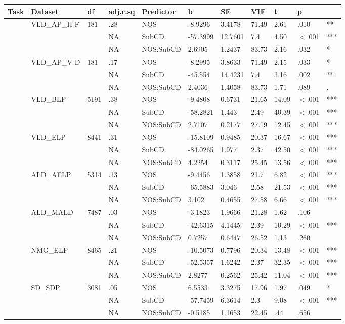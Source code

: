 \begin{table}[ht]
\centering
\begingroup\normalsize
\begin{tabular}{lllllllllll}
  \hline
Task & Dataset & df & adj.r.sq & Predictor & b & SE & VIF & t & p &  \\ 
  \hline
 & VLD\_AP\_H-F & 181 & .28 & NOS & -8.9296 & 3.4178 & 71.49 & 2.61 & .010 & ** \\ 
   &  &  & NA & SubCD & -57.3999 & 12.7601 & 7.4 & 4.50 & $<$.001 & *** \\ 
   &  &  & NA & NOS:SubCD & 2.6905 & 1.2437 & 83.73 & 2.16 & .032 & * \\ 
   & VLD\_AP\_V-D & 181 & .17 & NOS & -8.2995 & 3.8633 & 71.49 & 2.15 & .033 & * \\ 
   &  &  & NA & SubCD & -45.554 & 14.4231 & 7.4 & 3.16 & .002 & ** \\ 
   &  &  & NA & NOS:SubCD & 2.4036 & 1.4058 & 83.73 & 1.71 & .089 & . \\ 
   & VLD\_BLP & 5191 & .38 & NOS & -9.4808 & 0.6731 & 21.65 & 14.09 & $<$.001 & *** \\ 
   &  &  & NA & SubCD & -58.2821 & 1.443 & 2.49 & 40.39 & $<$.001 & *** \\ 
   &  &  & NA & NOS:SubCD & 2.7107 & 0.2177 & 27.19 & 12.45 & $<$.001 & *** \\ 
   & VLD\_ELP & 8441 & .31 & NOS & -15.8109 & 0.9485 & 20.37 & 16.67 & $<$.001 & *** \\ 
   &  &  & NA & SubCD & -84.0265 & 1.977 & 2.37 & 42.50 & $<$.001 & *** \\ 
   &  &  & NA & NOS:SubCD & 4.2254 & 0.3117 & 25.45 & 13.56 & $<$.001 & *** \\ 
   & ALD\_AELP & 5314 & .13 & NOS & -9.4456 & 1.3858 & 21.7 & 6.82 & $<$.001 & *** \\ 
   &  &  & NA & SubCD & -65.5883 & 3.046 & 2.58 & 21.53 & $<$.001 & *** \\ 
   &  &  & NA & NOS:SubCD & 3.102 & 0.4655 & 27.58 & 6.66 & $<$.001 & *** \\ 
   & ALD\_MALD & 7487 & .03 & NOS & -3.1823 & 1.9666 & 21.28 & 1.62 & .106 &   \\ 
   &  &  & NA & SubCD & -42.6315 & 4.1445 & 2.39 & 10.29 & $<$.001 & *** \\ 
   &  &  & NA & NOS:SubCD & 0.7257 & 0.6447 & 26.52 & 1.13 & .260 &   \\ 
   & NMG\_ELP & 8465 & .21 & NOS & -10.5073 & 0.7796 & 20.34 & 13.48 & $<$.001 & *** \\ 
   &  &  & NA & SubCD & -52.5357 & 1.6242 & 2.37 & 32.35 & $<$.001 & *** \\ 
   &  &  & NA & NOS:SubCD & 2.8277 & 0.2562 & 25.42 & 11.04 & $<$.001 & *** \\ 
   & SD\_SDP & 3081 & .05 & NOS & 6.5533 & 3.3275 & 17.96 & 1.97 & .049 & * \\ 
   &  &  & NA & SubCD & -57.7459 & 6.3614 & 2.3 & 9.08 & $<$.001 & *** \\ 
   &  &  & NA & NOS:SubCD & -0.5185 & 1.1653 & 22.45 & .44 & .656 &   \\ 
   \hline
\end{tabular}
\endgroup
\end{table}
